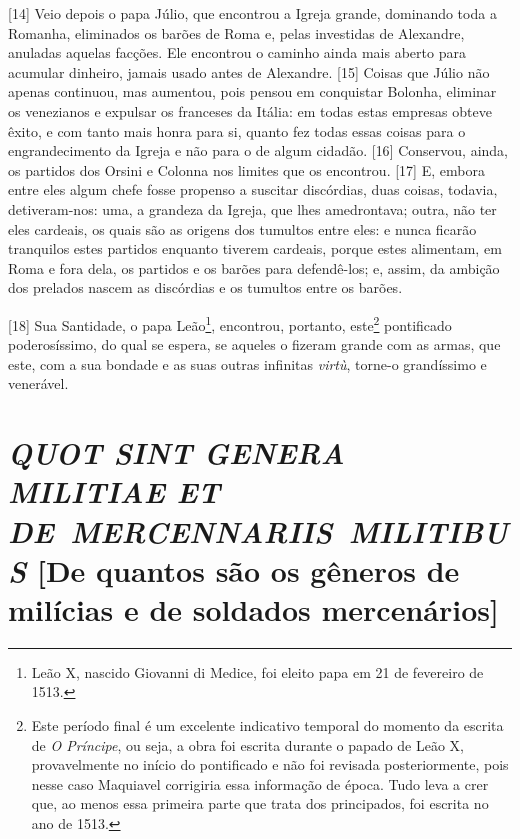 {[}14{]} Veio depois o papa Júlio, que encontrou a Igreja grande,
dominando toda a Romanha, eliminados os barões de Roma e, pelas
investidas de Alexandre, anuladas aquelas facções. Ele encontrou o
caminho ainda mais aberto para acumular dinheiro, jamais usado antes de
Alexandre. {[}15{]} Coisas que Júlio não apenas continuou, mas aumentou,
pois pensou em conquistar Bolonha, eliminar os venezianos e expulsar os
franceses da Itália: em todas estas empresas obteve êxito, e com tanto
mais honra para si, quanto fez todas essas coisas para o engrandecimento
da Igreja e não para o de algum cidadão. {[}16{]} Conservou, ainda, os
partidos dos Orsini e Colonna nos limites que os encontrou. {[}17{]} E,
embora entre eles algum chefe fosse propenso a suscitar discórdias, duas
coisas, todavia, detiveram-nos: uma, a grandeza da Igreja, que lhes
amedrontava; outra, não ter eles cardeais, os quais são as origens dos
tumultos entre eles: e nunca ficarão tranquilos estes partidos enquanto
tiverem cardeais, porque estes alimentam, em Roma e fora dela, os partidos e os barões para
defendê-los; e, assim, da ambição dos prelados nascem as discórdias e os
tumultos entre os barões.

{[}18{]} Sua Santidade, o papa Leão\footnote{Leão X, nascido Giovanni di
  Medice, foi eleito papa em 21 de fevereiro de 1513.}, encontrou,
portanto, este\footnote{Este período final é um excelente indicativo
  temporal do momento da escrita de \emph{O Príncipe}, ou seja, a obra
  foi escrita durante o papado de Leão X, provavelmente no início do
  pontificado e não foi revisada posteriormente, pois nesse caso
  Maquiavel corrigiria essa informação de época. Tudo leva a crer que,
  ao menos essa primeira parte que trata dos principados, foi escrita no
  ano de 1513.} pontificado poderosíssimo, do qual se espera, se aqueles
o fizeram grande com as armas, que este, com a sua bondade e as suas
outras infinitas \emph{virtù}, torne-o grandíssimo e venerável.

\quebra\section{\emph{QUOT SINT GENERA MILITIAE ET DE~MERCENNARIIS~MILITIBUS}\break
{[}De quantos são os gêneros de milícias e de soldados mercenários{]}}

